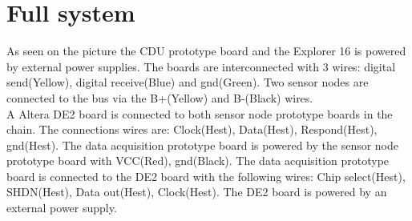 \section{Full system}
As seen on the picture the CDU prototype board and the Explorer 16 is powered by external power supplies. The boards are interconnected with 3 wires: digital send(Yellow), digital receive(Blue) and gnd(Green). Two sensor nodes are connected to the bus via the B+(Yellow) and B-(Black) wires.\\
A Altera DE2 board is connected to both sensor node prototype boards in the chain. The connections wires are: Clock(Hest), Data(Hest), Respond(Hest), gnd(Hest). The data acquisition prototype board is powered by the  sensor node prototype board with VCC(Red), gnd(Black). The data acquisition prototype board is connected to the DE2 board with the following wires: Chip select(Hest), SHDN(Hest), Data out(Hest), Clock(Hest). The DE2 board is powered by an external power supply.

